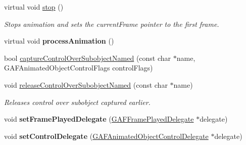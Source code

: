 \begin{DoxyCompactItemize}
\item 
\hypertarget{class_g_a_f_1_1_g_a_f_animated_object_ab6b1fd52c2d5ececd75cf22220222c94}{virtual void \hyperlink{class_g_a_f_1_1_g_a_f_animated_object_ab6b1fd52c2d5ececd75cf22220222c94}{stop} ()}\label{class_g_a_f_1_1_g_a_f_animated_object_ab6b1fd52c2d5ececd75cf22220222c94}

\begin{DoxyCompactList}\small\item\em Stops animation and sets the current\-Frame pointer to the first frame. \end{DoxyCompactList}\item 
\hypertarget{class_g_a_f_1_1_g_a_f_animated_object_afdfddf50af6b276240d6d975aa4df923}{virtual void {\bfseries process\-Animation} ()}\label{class_g_a_f_1_1_g_a_f_animated_object_afdfddf50af6b276240d6d975aa4df923}

\item 
bool \hyperlink{class_g_a_f_1_1_g_a_f_animated_object_ac0dbfe30685f12637a04be86692d4677}{capture\-Control\-Over\-Subobject\-Named} (const char $\ast$name, G\-A\-F\-Animated\-Object\-Control\-Flags control\-Flags)
\item 
\hypertarget{class_g_a_f_1_1_g_a_f_animated_object_a7a629ef5704339a80e7d446cbad99dbb}{void \hyperlink{class_g_a_f_1_1_g_a_f_animated_object_a7a629ef5704339a80e7d446cbad99dbb}{release\-Control\-Over\-Subobject\-Named} (const char $\ast$name)}\label{class_g_a_f_1_1_g_a_f_animated_object_a7a629ef5704339a80e7d446cbad99dbb}

\begin{DoxyCompactList}\small\item\em Releases control over subobject captured earlier. \end{DoxyCompactList}\item 
\hypertarget{class_g_a_f_1_1_g_a_f_animated_object_ab6c9e2664b8652e439120dd29cac613d}{void {\bfseries set\-Frame\-Played\-Delegate} (\hyperlink{class_g_a_f_1_1_g_a_f_frame_played_delegate}{G\-A\-F\-Frame\-Played\-Delegate} $\ast$delegate)}\label{class_g_a_f_1_1_g_a_f_animated_object_ab6c9e2664b8652e439120dd29cac613d}

\item 
\hypertarget{class_g_a_f_1_1_g_a_f_animated_object_aaeb788bd6ef40530e3687d08905bef2e}{void {\bfseries set\-Control\-Delegate} (\hyperlink{class_g_a_f_1_1_g_a_f_animated_object_control_delegate}{G\-A\-F\-Animated\-Object\-Control\-Delegate} $\ast$delegate)}\label{class_g_a_f_1_1_g_a_f_animated_object_aaeb788bd6ef40530e3687d08905bef2e}


\end{DoxyCompactItemize}
